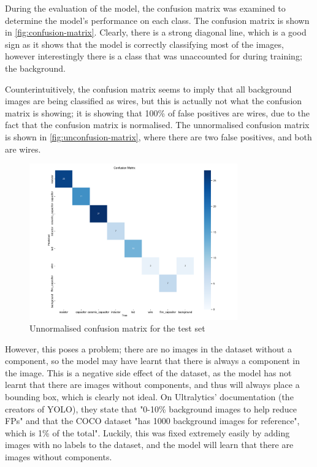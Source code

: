 During the evaluation of the model, the confusion matrix was examined to determine the model's performance on each class. The confusion matrix is shown in \autoref{fig:confusion-matrix}. Clearly, there is a strong diagonal line, which is a good sign as it shows that the model is correctly classifying most of the images, however interestingly there is a class that was unaccounted for during training; the background. 

Counterintuitively, the confusion matrix seems to imply that all background images are being classified as wires, but this is actually not what the confusion matrix is showing; it is showing that 100\% of false positives are wires, due to the fact that the confusion matrix is normalised. The unnormalised confusion matrix is shown in \autoref{fig:unconfusion-matrix}, where there are two false positives, and both are wires.

\begin{figure}[H]
    \centering
    \includegraphics[width=0.8\textwidth]{imgs/graphs/unconfusion_matrix_test.png}
    \caption{Unnormalised confusion matrix for the test set}
    \label{fig:unconfusion-matrix}
  \end{figure}

However, this poses a problem; there are no images in the dataset without a component, so the model may have learnt that there is always a component in the image. This is a negative side effect of the dataset, as the model has not learnt that there are images without components, and thus will always place a bounding box, which is clearly not ideal. On Ultralytics' documentation \cite{ultralytics_2023} (the creators of YOLO), they state that "0-10\% background images to help reduce FPs" and that the COCO dataset "has 1000 background images for reference", which is 1\% of the total". Luckily, this was fixed extremely easily by adding images with no labels to the dataset, and the model will learn that there are images without components.

